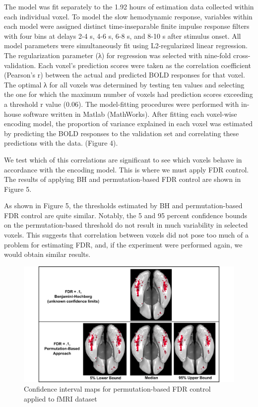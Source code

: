 \documentclass[11pt,notitlepage]{article}
\begin{document}
The model was fit separately to the 1.92 hours of estimation data
collected within each individual voxel. To model the slow hemodynamic
response, variables within each model were assigned distinct
time-inseparable finite impulse response filters with four bins at
delays 2-4 s, 4-6 s, 6-8 s, and 8-10 s after stimulus onset. All model
parameters were simultaneously fit using L2-regularized linear
regression. The regularization parameter (λ) for regression was selected
with nine-fold cross-validation. Each voxel's prediction scores were
taken as the correlation coefficient (Pearson's r) between the actual
and predicted BOLD responses for that voxel. The optimal λ for all
voxels was determined by testing ten values and selecting the one for
which the maximum number of voxels had prediction scores exceeding a
threshold r value (0.06). The model-fitting procedures were performed
with in-house software written in Matlab (MathWorks). After fitting each
voxel-wise encoding model, the proportion of variance explained in each
voxel was estimated by predicting the BOLD responses to the validation
set and correlating these predictions with the data. (Figure 4). 

We test which of this correlations are significant to see which voxels behave in accordance with the encoding model. This is where we must apply FDR control. The results of applying BH and permutation-based FDR control are shown in Figure 5. 

As shown in Figure 5, the thresholds estimated by BH and permutation-based FDR control are quite similar. Notably, the 5 and 95 percent confidence bounds on the permutation-based threshold do not result in much variability in selected voxels. This suggests that correlation between voxels did not pose too much of a problem for estimating FDR, and, if the experiment were performed again, we would obtain similar results. 

\begin{figure}[h c] %
\centering
\includegraphics[scale = .70]{Figures/Slide5.png}
\caption{\footnotesize Confidence interval maps for permutation-based FDR control applied to fMRI dataset}
\end{figure}
\end{document}
